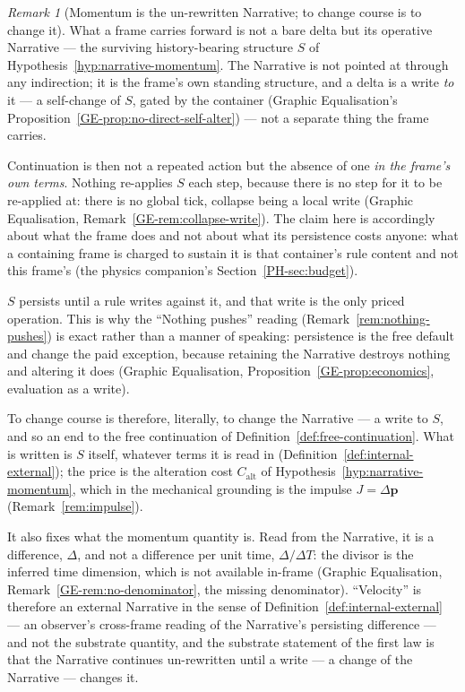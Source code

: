 \documentclass[11pt,a4paper]{article}
\theoremstyle{remark}
\newtheorem{remark}[definition]{Remark}
\begin{document}
\begin{remark}[Momentum is the un-rewritten Narrative; to change course is to change it]\label{rem:momentum-delta}
What a frame carries forward is not a bare delta but its operative Narrative --- the surviving history-bearing structure $S$ of Hypothesis~\ref{hyp:narrative-momentum}. The Narrative is not pointed at through any indirection; it is the frame's own standing structure, and a delta is a write \emph{to} it --- a self-change of $S$, gated by the container (Graphic Equalisation's Proposition~\ref{GE-prop:no-direct-self-alter}) --- not a separate thing the frame carries.

Continuation is then not a repeated action but the absence of one \emph{in the frame's own terms}. Nothing re-applies $S$ each step, because there is no step for it to be re-applied at: there is no global tick, collapse being a local write (Graphic Equalisation, Remark~\ref{GE-rem:collapse-write}). The claim here is accordingly about what the frame does and not about what its persistence costs anyone: what a containing frame is charged to sustain it is that container's rule content and not this frame's (the physics companion's Section~\ref{PH-sec:budget}).

$S$ persists until a rule writes against it, and that write is the only priced operation. This is why the ``Nothing pushes'' reading (Remark~\ref{rem:nothing-pushes}) is exact rather than a manner of speaking: persistence is the free default and change the paid exception, because retaining the Narrative destroys nothing and altering it does (Graphic Equalisation, Proposition~\ref{GE-prop:economics}, evaluation as a write).

To change course is therefore, literally, to change the Narrative --- a write to $S$, and so an end to the free continuation of Definition~\ref{def:free-continuation}. What is written is $S$ itself, whatever terms it is read in (Definition~\ref{def:internal-external}); the price is the alteration cost $C_{\mathrm{alt}}$ of Hypothesis~\ref{hyp:narrative-momentum}, which in the mechanical grounding is the impulse $J=\Delta\mathbf p$ (Remark~\ref{rem:impulse}).

It also fixes what the momentum quantity is. Read from the Narrative, it is a difference, $\Delta$, and not a difference per unit time, $\Delta/\Delta T$: the divisor is the inferred time dimension, which is not available in-frame (Graphic Equalisation, Remark~\ref{GE-rem:no-denominator}, the missing denominator). ``Velocity'' is therefore an external Narrative in the sense of Definition~\ref{def:internal-external} --- an observer's cross-frame reading of the Narrative's persisting difference --- and not the substrate quantity, and the substrate statement of the first law is that the Narrative continues un-rewritten until a write --- a change of the Narrative --- changes it.
\end{remark}
\end{document}
